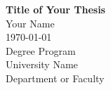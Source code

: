 
\begin{titlepage}
  \centering
  \vspace*{\fill}
  {\Huge\bfseries Title of Your Thesis\\}
  \vspace{1cm}
  {\Large Your Name\\}
  \vspace{0.5cm}
  {\large \today\\}
  \vspace{2cm}
  {\large Degree Program\\}
  {\large University Name\\}
  {\large Department or Faculty\\}
  \vspace*{\fill}
\end{titlepage}